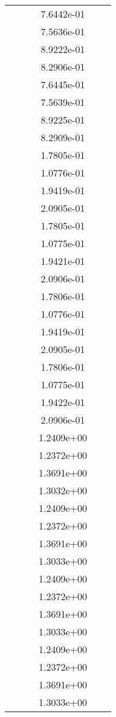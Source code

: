 \begin{xltabular}{\textwidth}{r|rS[table-format=1.3e+2]S[table-format=1.4e+2]S[table-format=1.4e+2]S[table-format=-1.5]}
&  &  & 7.6442e-01 & & \\
&  &  & 7.5636e-01 & & \\
&  &  & 8.9222e-01 & & \\
&  &  & 8.2906e-01 & & \\
&  &  & 7.6445e-01 & & \\
&  &  & 7.5639e-01 & & \\
&  &  & 8.9225e-01 & & \\
&  &  & 8.2909e-01 & & \\
&  &  & 1.7805e-01 & & \\
&  &  & 1.0776e-01 & & \\
&  &  & 1.9419e-01 & & \\
&  &  & 2.0905e-01 & & \\
&  &  & 1.7805e-01 & & \\
&  &  & 1.0775e-01 & & \\
&  &  & 1.9421e-01 & & \\
&  &  & 2.0906e-01 & & \\
&  &  & 1.7806e-01 & & \\
&  &  & 1.0776e-01 & & \\
&  &  & 1.9419e-01 & & \\
&  &  & 2.0905e-01 & & \\
&  &  & 1.7806e-01 & & \\
&  &  & 1.0775e-01 & & \\
&  &  & 1.9422e-01 & & \\
&  &  & 2.0906e-01 & & \\
&  &  & 1.2409e+00 & & \\
&  &  & 1.2372e+00 & & \\
&  &  & 1.3691e+00 & & \\
&  &  & 1.3032e+00 & & \\
&  &  & 1.2409e+00 & & \\
&  &  & 1.2372e+00 & & \\
&  &  & 1.3691e+00 & & \\
&  &  & 1.3033e+00 & & \\
&  &  & 1.2409e+00 & & \\
&  &  & 1.2372e+00 & & \\
&  &  & 1.3691e+00 & & \\
&  &  & 1.3033e+00 & & \\
&  &  & 1.2409e+00 & & \\
&  &  & 1.2372e+00 & & \\
&  &  & 1.3691e+00 & & \\
&  &  & 1.3033e+00 & & \\

\end{xltabular}
